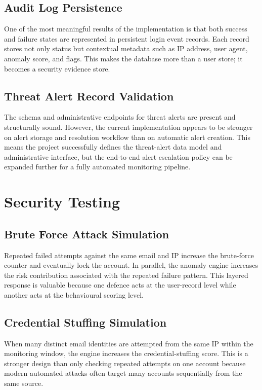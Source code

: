 \subsection{Audit Log Persistence}
One of the most meaningful results of the implementation is that both success and failure states are represented in persistent login event records. Each record stores not only status but contextual metadata such as IP address, user agent, anomaly score, and flags. This makes the database more than a user store; it becomes a security evidence store.

\subsection{Threat Alert Record Validation}
The schema and administrative endpoints for threat alerts are present and structurally sound. However, the current implementation appears to be stronger on alert storage and resolution workflow than on automatic alert creation. This means the project successfully defines the threat-alert data model and administrative interface, but the end-to-end alert escalation policy can be expanded further for a fully automated monitoring pipeline.

\section{Security Testing}

\subsection{Brute Force Attack Simulation}
Repeated failed attempts against the same email and IP increase the brute-force counter and eventually lock the account. In parallel, the anomaly engine increases the risk contribution associated with the repeated failure pattern. This layered response is valuable because one defence acts at the user-record level while another acts at the behavioural scoring level.

\subsection{Credential Stuffing Simulation}
When many distinct email identities are attempted from the same IP within the monitoring window, the engine increases the credential-stuffing score. This is a stronger design than only checking repeated attempts on one account because modern automated attacks often target many accounts sequentially from the same source.

